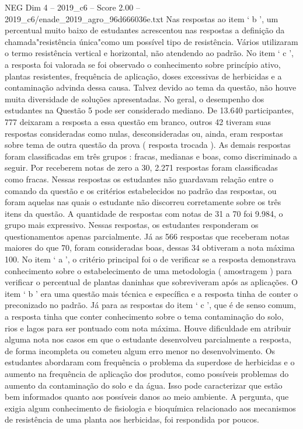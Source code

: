 \begin{textsample}{NEG Dim 4 – 2019\_c6 – Score 2.00 – 2019\_c6/enade\_2019\_agro\_96d666036e.txt}
Nas respostas ao item ‘ b ’, um percentual muito baixo de estudantes acrescentou nas respostas a definição da chamada"resistência única"como um possível tipo de resistência.
Vários utilizaram o termo resistência vertical e horizontal, não atendendo ao padrão.
No item ‘ c ’, a resposta foi valorada se foi observado o conhecimento sobre princípio ativo, plantas resistentes, frequência de aplicação, doses excessivas de herbicidas e a contaminação advinda dessa causa.
Talvez devido ao tema da questão, não houve muita diversidade de soluções apresentadas.
No geral, o desempenho dos estudantes na Questão 5 pode ser considerado mediano.
De 13.640 participantes, 777 deixaram a resposta a essa questão em branco, outros 42 tiveram suas respostas consideradas como nulas, desconsideradas ou, ainda, eram respostas sobre tema de outra questão da prova ( resposta trocada ).
As demais respostas foram classificadas em três grupos : fracas, medianas e boas, como discriminado a seguir.
Por receberem notas de zero a 30, 2.271 respostas foram classificadas como fracas.
Nessas respostas os estudantes não guardavam relação entre o comando da questão e os critérios estabelecidos no padrão das respostas, ou foram aquelas nas quais o estudante não discorreu corretamente sobre os três itens da questão.
A quantidade de respostas com notas de 31 a 70 foi 9.984, o grupo mais expressivo.
Nessas respostas, os estudantes responderam os questionamentos apenas parcialmente.
Já as 566 respostas que receberam notas maiores do que 70, foram consideradas boas, dessas 34 obtiveram a nota máxima 100.
No item ‘ a ’, o critério principal foi o de verificar se a resposta demonstrava conhecimento sobre o estabelecimento de uma metodologia ( amostragem ) para verificar o percentual de plantas daninhas que sobreviveram após as aplicações.
O item ‘ b ’ era uma questão mais técnica e específica e a resposta tinha de conter o preconizado no padrão.
Já para as respostas do item ‘ c ’, que é de senso comum, a resposta tinha que conter conhecimento sobre o tema contaminação do solo, rios e lagos para ser pontuado com nota máxima.
Houve dificuldade em atribuir alguma nota nos casos em que o estudante desenvolveu parcialmente a resposta, de forma incompleta ou cometeu algum erro menor no desenvolvimento.
Os estudantes abordaram com frequência o problema da superdose de herbicidas e o aumento na frequência de aplicação dos produtos, como possíveis problemas do aumento da contaminação do solo e da água.
Isso pode caracterizar que estão bem informados quanto aos possíveis danos ao meio ambiente.
A pergunta, que exigia algum conhecimento de fisiologia e bioquímica relacionado aos mecanismos de resistência de uma planta aos herbicidas, foi respondida por poucos.

\end{textsample}
